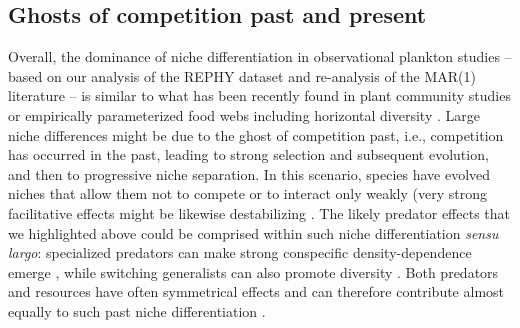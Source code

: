 \documentclass[10pt]{article}
\begin{document}
\subsection*{Ghosts of competition past and present}

Overall, the dominance of niche differentiation in observational plankton
studies -- based on our analysis of the REPHY dataset and re-analysis
of the MAR(1) literature -- is similar to what has been recently
found in plant community studies \citep{volkov_patterns_2007,adler_competition_2018}
or empirically parameterized food webs including horizontal diversity
\citep{barabas_self-regulation_2017}. Large niche differences might
be due to the ghost of competition past, i.e., competition has
occurred in the past, leading to strong selection and subsequent evolution, and then to progressive niche separation. In this scenario, species
have evolved niches that allow them not to compete or to interact
only weakly (very strong facilitative effects might be likewise destabilizing
\citep{coyte_ecology_2015}. The likely predator effects that we highlighted
above could be comprised within such niche differentiation \emph{sensu
largo}: specialized predators can make strong conspecific density-dependence
emerge \citep{bagchi_pathogens_2014,comita_testing_2014}, while switching
generalists can also promote diversity \citep{vallina2014maximal}.
Both predators and resources have often symmetrical effects and can
therefore contribute almost equally to such past niche differentiation
\citep{chesson_updates_2018}.
\end{document}
